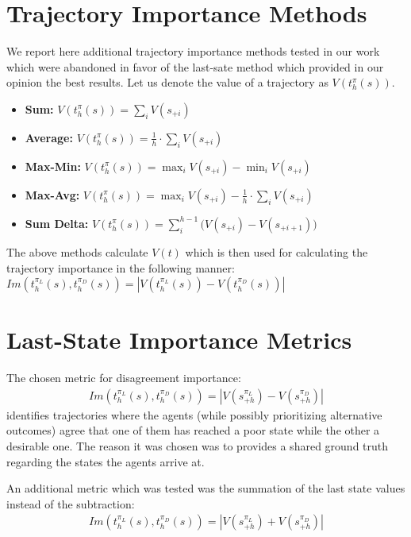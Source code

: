 \section{Trajectory Importance Methods}
We report here additional trajectory importance methods tested in our work which
were abandoned in favor of the last-sate method which provided in our opinion
the best results. Let us denote the value of a trajectory as
$V({t}_{h}^{\pi}(s))$. 
\begin{itemize}
    \item \textbf{Sum:} 
    $V({t}_{h}^{\pi}(s)) = \sum_i V(s_{+i})$
    \item \textbf{Average:} 
    $V({t}_{h}^{\pi}(s)) = \frac{1}{h} \cdot \sum_i V(s_{+i})$
    \item \textbf{Max-Min:} 
    $V({t}_{h}^{\pi}(s)) = \max_i V(s_{+i}) -  \min_i V(s_{+i})$
    \item \textbf{Max-Avg:}
    $V({t}_{h}^{\pi}(s)) = \max_i V(s_{+i}) - \frac{1}{h} \cdot \sum_i
    V(s_{+i})$
    \item \textbf{Sum Delta:}
    $V({t}_{h}^{\pi}(s)) =  \sum^{h-1}_i \big (V(s_{+i}) - V(s_{+i+1}) \big) $ 
 
\end{itemize}
The above methods calculate $V(t)$ which is then used for calculating the
trajectory importance in the following manner:
$ Im({t}_{h}^{\pi_{L}}(s),{t}_{h}^{\pi_{D}}(s)) = 
|V(t_{h}^{\pi_L}(s)) - V(t_{h}^{\pi_D}(s))| $

\section{Last-State Importance Metrics}
The chosen metric for disagreement importance:
\begin{align}
    Im({t}_{h}^{\pi_{L}}(s),{t}_{h}^{\pi_{D}}(s)) = 
    |V(s^{\pi_L}_{+h}) - V(s^{\pi_D}_{+h})|
\end{align}
identifies trajectories where the agents (while possibly prioritizing alternative outcomes) agree that
one of them has reached a poor state while the other a desirable one. The reason it was chosen was to provides a shared
ground truth regarding the states the agents arrive at.

An additional metric which was tested was the summation of the last state values instead of the subtraction:
\begin{align}
    Im({t}_{h}^{\pi_{L}}(s),{t}_{h}^{\pi_{D}}(s)) = 
    |V(s^{\pi_L}_{+h}) + V(s^{\pi_D}_{+h})|
\end{align}

